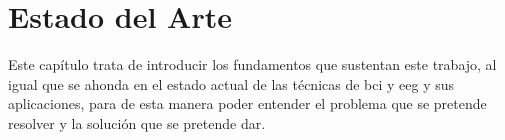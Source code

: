 \section{Estado del Arte}

Este capítulo trata de introducir los fundamentos que sustentan este trabajo, al igual que se ahonda en el estado actual de las técnicas de \acrfull{bci} y \acrfull{eeg} y sus aplicaciones, para de esta manera poder entender el problema que se pretende resolver y la solución que se pretende dar.























